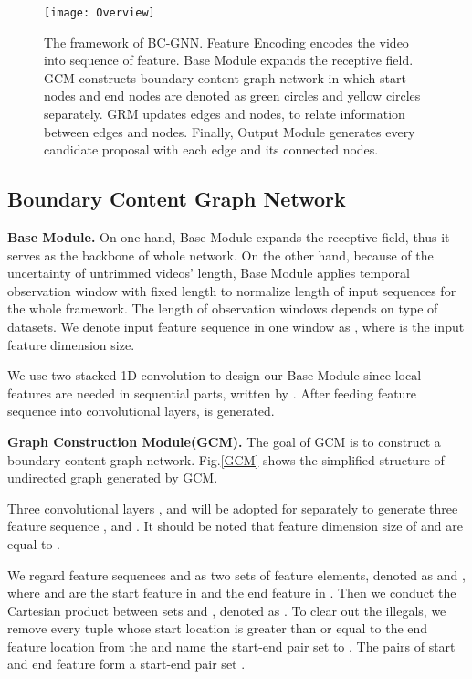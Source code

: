 \documentclass[runningheads]{llncs}
\begin{document}
\begin{figure}
\setlength{\belowcaptionskip}{0cm}
\setlength{\abovecaptionskip}{0.3cm}
\centering
\texttt{[image: Overview]}
\caption{The framework of BC-GNN. Feature Encoding encodes the video into sequence of feature. Base Module expands the receptive field. GCM constructs boundary content graph network in which start nodes and end nodes are denoted as green circles and yellow circles separately. GRM updates edges and nodes, to relate information between edges and nodes. Finally, Output Module generates every candidate proposal with each edge and its connected nodes.    }
\label{overview}
\end{figure}



\subsection{Boundary Content Graph Network}


\noindent\textbf{Base Module.}
On one hand, Base Module expands the receptive field, thus it serves as the backbone of whole network. On the other hand, because of the uncertainty of untrimmed videos' length, Base Module applies temporal observation window with fixed length  to normalize length of input sequences for the whole framework. The length of observation windows depends on type of datasets. We denote input feature sequence in one window as , where  is the input feature dimension size.

We use two stacked 1D convolution to design our Base Module since local features are needed in sequential parts, written by . After feeding feature sequence  into convolutional layers,  is generated. 

\noindent\textbf{Graph Construction Module(GCM).}
The goal of GCM is to construct a boundary content graph network. Fig.\ref{GCM} shows the simplified structure of undirected graph generated by GCM.

Three convolutional layers ,  and  will be adopted for  separately to generate three feature sequence ,  and . It should be noted that feature dimension size of  and  are equal to .

 We regard feature sequences  and  as two sets of feature elements, denoted as  and , where  and  are the  start feature in  and the  end feature in . Then we conduct the Cartesian product between sets  and , denoted as .  To clear out the illegals, we remove every tuple whose start location  is greater than or equal to the end feature location  from the  and name the start-end pair set to . The pairs of start and end feature form a start-end pair set .
\end{document}
